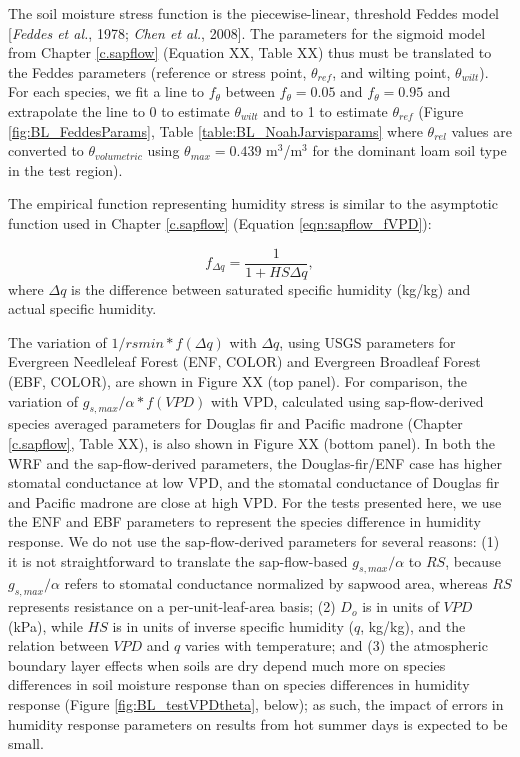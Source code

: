 The soil moisture stress function is the piecewise-linear, threshold Feddes model [\textit{Feddes et al.}, 1978; \textit{Chen et al.}, 2008].  The parameters for the sigmoid model from Chapter \ref{c.sapflow} (Equation XX, Table XX) thus must be translated to the Feddes parameters (reference or stress point, $\theta_{ref}$, and wilting point, $\theta_{wilt}$).  For each species, we fit a line to $f_{\theta}$ between $f_{\theta}=0.05$ and $f_{\theta}=0.95$ and extrapolate the line to 0 to estimate $\theta_{wilt}$ and to 1 to estimate $\theta_{ref}$ (Figure \ref{fig:BL_FeddesParams}, Table \ref{table:BL_NoahJarvisparams} where $\theta_{rel}$ values are converted to $\theta_{volumetric}$ using $\theta_{max} = 0.439$ m$^3$/m$^3$ for the dominant loam soil type in the test region).


The empirical function representing humidity stress is similar to the asymptotic function used in Chapter \ref{c.sapflow} (Equation \ref{eqn:sapflow_fVPD}):

\begin{equation}
f_{\Delta q} = \frac{1}{1+HS \Delta q},
\end{equation}
where $\Delta q$ is the difference between saturated specific humidity (kg/kg) and actual specific humidity.

The variation of $1/rsmin * f(\Delta q)$ with $\Delta q$, using USGS parameters for Evergreen Needleleaf Forest (ENF, COLOR) and Evergreen Broadleaf Forest (EBF, COLOR), are shown in Figure XX (top panel).  For comparison, the variation of $g_{s, max}/\alpha * f(VPD)$ with VPD, calculated using sap-flow-derived species averaged parameters for Douglas fir and Pacific madrone (Chapter \ref{c.sapflow}, Table XX), is also shown in Figure XX (bottom panel).  In both the WRF and the sap-flow-derived parameters, the Douglas-fir/ENF case has higher stomatal conductance at low VPD, and the stomatal conductance of Douglas fir and Pacific madrone are close at high VPD.  For the tests presented here, we use the ENF and EBF parameters to represent the species difference in humidity response.  We do not use the sap-flow-derived parameters for several reasons: (1) it is not straightforward to translate the sap-flow-based $g_{s,max}/\alpha$ to $RS$, because $g_{s,max}/\alpha$ refers to stomatal conductance normalized by sapwood area, whereas $RS$ represents resistance on a per-unit-leaf-area basis; (2) $D_o$ is in units of $VPD$ (kPa), while $HS$ is in units of inverse specific humidity ($q$, kg/kg), and the relation between $VPD$ and $q$ varies with temperature; and (3) the atmospheric boundary layer effects when soils are dry depend much more on species differences in soil moisture response than on species differences in humidity response (Figure \ref{fig:BL_testVPDtheta}, below); as such, the impact of errors in humidity response parameters on results from hot summer days is expected to be small.

